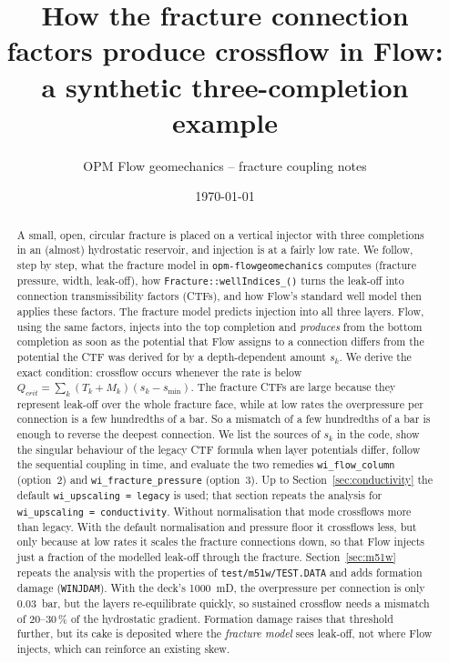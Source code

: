\documentclass[11pt,a4paper]{article}
\title{How the fracture connection factors produce crossflow in Flow:\\
a synthetic three-completion example}
\author{OPM Flow geomechanics -- fracture coupling notes}
\date{\today}
\begin{document}
\maketitle

\begin{abstract}
\noindent
A small, open, circular fracture is placed on a vertical injector with three completions in an
(almost) hydrostatic reservoir, and injection is at a fairly low rate.  We follow, step by step,
what the fracture model in \texttt{opm-flowgeomechanics} computes (fracture pressure, width,
leak-off), how \texttt{Fracture::wellIndices\_()} turns the leak-off into connection
transmissibility factors (CTFs), and how Flow's standard well model then applies these factors.
The fracture model predicts injection into all three layers.  Flow, using the same factors,
injects into the top completion and \emph{produces} from the bottom completion as soon as the
potential that Flow assigns to a connection differs from the potential the CTF was derived for
by a depth-dependent amount $s_k$.  We derive the exact condition: crossflow occurs whenever the
rate is below $Q_{crit}=\sum_k (T_k+M_k)(s_k-s_{\min})$.  The fracture CTFs are large because they
represent leak-off over the whole fracture face, while at low rates the overpressure per
connection is a few hundredths of a bar.  So a mismatch of a few hundredths of a bar is enough
to reverse the deepest connection.  We list the sources of $s_k$ in the code, show the
singular behaviour of the legacy CTF formula when layer potentials differ, follow the sequential
coupling in time, and evaluate the two remedies \texttt{wi\_flow\_column} (option~2) and
\texttt{wi\_fracture\_pressure} (option~3).  Up to Section~\ref{sec:conductivity} the default
\texttt{wi\_upscaling = legacy} is used; that section repeats the analysis for
\texttt{wi\_upscaling = conductivity}.  Without normalisation that mode crossflows more than
legacy.  With the default normalisation and pressure floor it crossflows less, but only
because at low rates it scales the fracture connections down, so that Flow injects just a
fraction of the modelled leak-off through the fracture.
Section~\ref{sec:m51w} repeats the analysis with the properties of \texttt{test/m51w/TEST.DATA}
and adds formation damage (\texttt{WINJDAM}).  With the deck's 1000~mD, the overpressure per
connection is only 0.03~bar, but the layers re-equilibrate quickly, so sustained crossflow needs
a mismatch of 20--30\,\% of the hydrostatic gradient.  Formation damage raises that threshold
further, but its cake is deposited where the \emph{fracture model} sees leak-off, not where Flow
injects, which can reinforce an existing skew.
\end{abstract}
\end{document}

